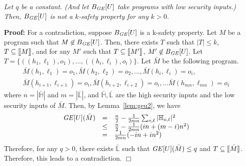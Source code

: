 \documentclass{llncs}
\newenvironment{proof}{\noindent\rm{\bf Proof:}}{\hbox{$\Box$}\vspace*{0.2\baselineskip}}
\newenvironment{reftheorem}[1]{\begin{trivlist}\item[\hskip
      \labelsep{\bf Theorem #1.}]\it}{\end{trivlist}}
\newcommand{\aset}[1]{\{{#1}\}}
\newcommand{\sembrack}[1]{[\hspace*{-1.2pt}[#1]\hspace*{-1.2pt}]}
\begin{document}
\begin{reftheorem}{\ref{thm:genk}}
Let $q$ be a constant.  (And let $B_{\it GE}[U]$ take programs with
low security inputs.) Then, $B_{\it GE}[U]$ is not a $k$-safety
property for any $k > 0$.
\end{reftheorem}
\begin{proof}
  For a contradiction, suppose $B_{\it GE}[U]$ is a k-safety property.
  Let $M$ be a program such that $M\not\in B_{\it GE}[U]$.  Then,
  there exists $T$ such that $|T|\le k$, $T\subseteq\sembrack{M}$, and
  for any $M'$ such that $T\subseteq \sembrack{M'}$, $M'\not\in
  B_{\it GE}[U]$.  Let
  $T=\aset{((h_1,\ell_1),o_1),\dots,((h_i,\ell_i),o_i)}$.  Let
  $\bar{M}$ be the following program.
\[
\begin{array}{l}
  \bar{M}(h_1,\ell_1)=o_1, \bar{M}(h_2,\ell_2)=o_2, \dots, \bar{M}(h_i,\ell_i)=o_i,\\
  \bar{M}(h_{i+1},\ell_{i+1})=o_i, \bar{M}(h_{i+2},\ell_{i+2})=o_i, \dots \bar{M}(h_{mn},\ell_{mn})=o_i
\end{array}
\]
where $n=|\mathbb{\bar{H}}|$ and $m=|\mathbb{\bar{L}}|$, and
$\mathbb{\bar{H}}, \mathbb{\bar{L}}$ are the high security inputs and
the low security inputs of $\bar{M}$.  Then, by Lemma~\ref{lem:geu2},
we have
\[
\begin{array}{rcl}
  {\it GE}[U](\bar{M})&=&\frac{n}{2}-\frac{1}{2mn}\sum_{o,\ell}|\mathbb{H}_{o,\ell}|^2\\
  &\le&\frac{n}{2}-\frac{1}{2mn}(in+(m-i)n^2)\\
  &=&\frac{1}{2mn}(-in+in^2)
\end{array}
\]
Therefore, for any $q > 0$, there exists $\mathbb{\bar{L}}$ such that
${\it GE}[U](\bar{M}) \leq q$ and $T\subseteq\sembrack{\bar{M}}$.
Therefore, this leads to a contradiction.
\end{proof}
\end{document}
